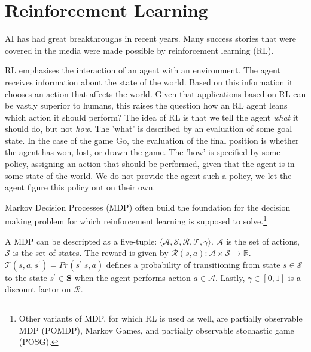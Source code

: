 \section{Reinforcement Learning}
\label{rl}

AI has had great breakthroughs in recent years. Many success stories that were covered in the media were made possible by reinforcement learning (RL).

RL emphasises the interaction of an agent with an environment. The agent receives information about the state of the world. Based on this information it chooses an action that affects the world. Given that applications based on RL can be vastly superior to humans, this raises the question how an RL agent leans which action it should perform? The idea of RL is that we tell the agent \emph{what} it should do, but not \emph{how}. The 'what' is described by an evaluation of some goal state. In the case of the game Go, the evaluation of the final position is whether the agent has won, lost, or drawn the game. The 'how' is specified by some policy, assigning an action that should be performed, given that the agent is in some state of the world. We do not provide the agent such a policy, we let the agent figure this policy out on their own.

Markov Decision Processes (MDP) often build the foundation for the decision making problem for which reinforcement learning is supposed to solve.\footnote{Other variants of MDP, for which RL is used as well, are partially observable MDP (POMDP), Markov Games, and partially observable stochastic game (POSG).}

A MDP can be descripted as a five-tuple: $\langle \mathcal{A,S,R,T,\gamma} \rangle$. $\mathcal{A}$ is the set of actions, $\mathcal{S}$ is the set of states. The reward is given by $\mathcal{R}(s,a): \mathcal{A} \times \mathcal{S} \rightarrow \mathds{R}$. $\mathcal{T}(s,a,s^{\prime}) = Pr(s^{\prime} | s,a)$ defines a probability of transitioning from state $s \in \mathcal{S}$ to the state $s^{\prime} \in \mathbf{S}$ when the agent performs action $a \in \mathcal{A}$. Lastly, $\gamma \in [0,1]$ is a discount factor on $\mathcal{R}$. 